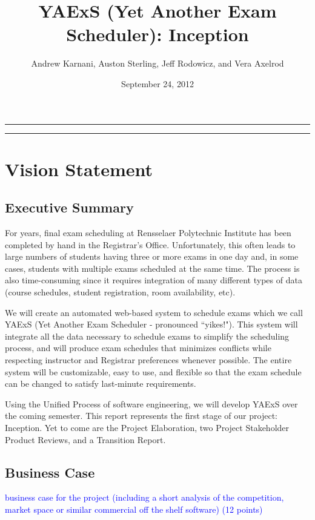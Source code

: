\documentclass[11pt]{article}
\author{Andrew Karnani, Auston Sterling, Jeff Rodowicz, and Vera Axelrod}
\title{YAExS {(Yet Another Exam Scheduler)}: Inception}
\date{September 24, 2012}
\begin{document}
\maketitle
\vspace{-0.1in}
\hrule

\tableofcontents %

\vspace{0.3in}
\hrule

\section{Vision Statement}
\subsection{Executive Summary} %

For years, final exam scheduling at Rensselaer Polytechnic Institute has been
 completed by hand in the Registrar’s Office.
Unfortunately, this often leads to large numbers of students having three or more
 exams in one day and, in some cases, students with multiple exams scheduled at
 the same time.
 The process is also time-consuming since it requires integration of many different
 types of data (course schedules, student registration, room availability, etc).

We will create an automated web-based system to schedule exams which we call YAExS
(Yet Another Exam Scheduler - pronounced ``yikes!").
This system will integrate all the data necessary to schedule exams to simplify the
scheduling process, and will produce exam schedules that minimizes conflicts
while respecting instructor and Registrar preferences whenever possible.
The entire system will be customizable, easy to use, and flexible
so that the exam schedule can be changed to satisfy last-minute requirements.

Using the Unified Process of software engineering, we will develop YAExS
 over the coming semester.
This report represents the first stage of our project: Inception.
Yet to come are the Project Elaboration, two Project Stakeholder Product Reviews,
 and a Transition Report.


\subsection{Business Case} %
\textcolor{blue}{ business case for the project (including a short analysis of the
 competition, market space or similar commercial off the shelf software) (12 points)}
\end{document}
